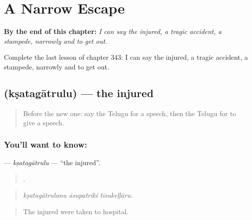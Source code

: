 
\chapter{A Narrow Escape}
\label{ch:te-a-narrow-escape}

\begin{chapteropening}
\textbf{By the end of this chapter:} \emph{I can say the injured, a tragic accident, a stampede, narrowly and to get out.}

Complete the last lesson of chapter 343: I can say the injured, a tragic accident, a stampede, narrowly and to get out.
\end{chapteropening}

\section[\texorpdfstring{\te{క్షతగాత్రులు} (kṣatagātrulu)}{క్షతగాత్రులు (kṣatagātrulu)}]{ (kṣatagātrulu) — the injured}

\label{lesson:TE-C343-ksatagatrulu}



\begin{quote}
Before the new one: say the Telugu for a speech, then the Telugu for to give a speech.
\end{quote}

\subsection*{You'll want to know: }
\textbf{} — \emph{kṣatagātrulu} — \textquotedblleft{}the injured\textquotedblright{}.

\begin{quote}
  .
\end{quote}

\begin{quote}
\emph{kṣatagātrulanu āsupatriki tīsukeḷḷāru.}
\end{quote}

\begin{quote}
The injured were taken to hospital.
\end{quote}

